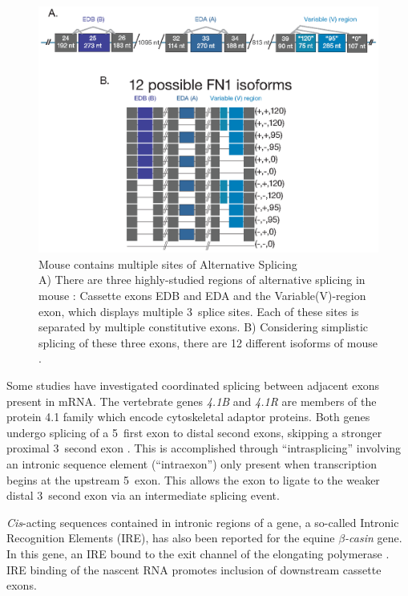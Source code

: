     \begin{figure} %
      \centering
      \includegraphics{Figures/Intro/Fibronectin.eps}
      \caption[Mouse \fn{} contains multiple sites of Alternative Splicing]
      {
        Mouse \fn{} contains multiple sites of Alternative Splicing\\[0.25cm]
        A) There are three highly-studied regions of alternative splicing in mouse \fn{}: Cassette exons EDB and EDA and the Variable(V)-region exon, which displays multiple 3\textprime~splice sites.  Each of these sites is separated by multiple constitutive exons. B) Considering simplistic splicing of these three exons, there are 12 different isoforms of mouse \fn{}.
        }
      \label{Intro:fig:mouseFn1}
      \end{figure}

    Some studies have investigated coordinated splicing between adjacent exons present in mRNA. The vertebrate genes \textit{4.1B} and \textit{4.1R} are members of the protein 4.1 family which encode cytoskeletal adaptor proteins. Both genes undergo splicing of a 5\textprime~first exon to distal second exons, skipping a stronger proximal 3\textprime~second exon \citep{Parra2008, Parra2012}. This is accomplished through ``intrasplicing'' involving an intronic sequence element (``intraexon'') only present when transcription begins at the upstream 5\textprime~exon. This allows the exon to ligate to the weaker distal 3\textprime~second exon via an intermediate splicing event.

    \textit{Cis}-acting sequences contained in intronic regions of a gene, a so-called Intronic Recognition Elements (IRE), has also been reported for the equine \textit{$\beta$-casin} gene. In this gene, an IRE bound to the exit channel of the elongating polymerase \citep{Lenasi2006}. IRE binding of the nascent RNA promotes inclusion of downstream cassette exons.

